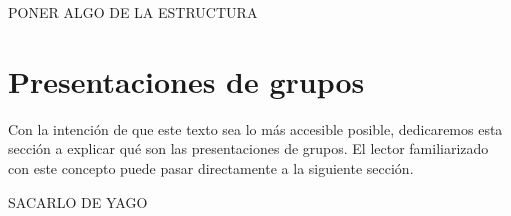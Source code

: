 \documentclass[bibtex, anon]{TEMat-article}
\begin{document}
PONER ALGO DE LA ESTRUCTURA
%

\section{Presentaciones de grupos}

Con la intención de que este texto sea lo más accesible posible, dedicaremos esta sección a explicar qué son las presentaciones de grupos. El lector familiarizado con este concepto puede pasar directamente a la siguiente sección. 

SACARLO DE YAGO
\end{document}
